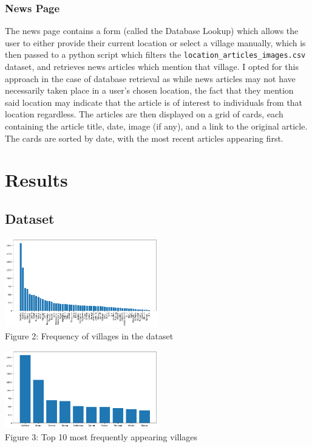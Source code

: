 \documentclass[a4paper, oneside, 11pt]{article}
\begin{document}
\begin{multicols*}{2}
  \subsubsection{News Page}
  The news page contains a form (called the Database Lookup) which allows the user to either provide their current location or select a village manually, which is then passed to a python script which filters the \verb|location_articles_images.csv| dataset, and retrieves news articles which mention that village. I opted for this approach in the case of database retrieval as while news articles may not have necessarily taken place in a user's chosen location, the fact that they mention said location may indicate that the article is of interest to individuals from that location regardless. The articles are then displayed on a grid of cards, each containing the article title, date, image (if any), and a link to the original article. The cards are sorted by date, with the most recent articles appearing first.


  \section{Results}
  \subsection{Dataset}
  \begin{center}
    \includegraphics[width=0.5\textwidth]{./figures/villagefreq.png} \\
    Figure 2: Frequency of villages in the dataset
  \end{center}

  \begin{center}
    \includegraphics[width=0.5\textwidth]{./figures/villagefreqtop10.png} \\
    Figure 3: Top 10 most frequently appearing villages
  \end{center}


\end{multicols*}
\end{document}
